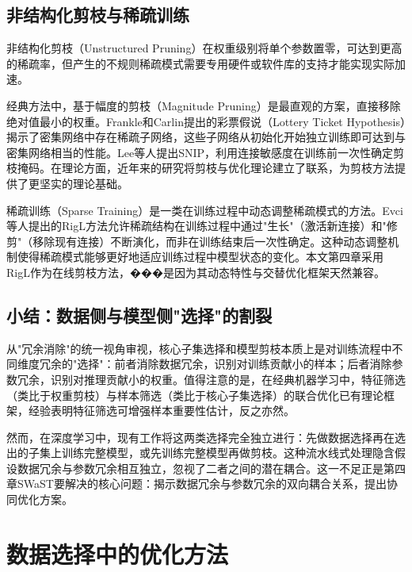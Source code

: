 \subsection{非结构化剪枝与稀疏训练}

非结构化剪枝（Unstructured Pruning）在权重级别将单个参数置零\cite{han2015learning, han2016deep}，可达到更高的稀疏率，但产生的不规则稀疏模式需要专用硬件或软件库的支持才能实现实际加速。

经典方法中，基于幅度的剪枝（Magnitude Pruning）\cite{han2015learning}是最直观的方案，直接移除绝对值最小的权重。Frankle和Carlin\cite{frankle2018lottery}提出的彩票假说（Lottery Ticket Hypothesis）揭示了密集网络中存在稀疏子网络，这些子网络从初始化开始独立训练即可达到与密集网络相当的性能。Lee等人\cite{lee2018snip}提出SNIP，利用连接敏感度在训练前一次性确定剪枝掩码。在理论方面，近年来的研究将剪枝与优化理论建立了联系\cite{grosse2016kronecker, zhou2021effective, louizos2017learning, qian2021probabilistic}，为剪枝方法提供了更坚实的理论基础。

稀疏训练（Sparse Training）是一类在训练过程中动态调整稀疏模式的方法。Evci等人\cite{evci2020rigging}提出的RigL方法允许稀疏结构在训练过程中通过"生长"（激活新连接）和"修剪"（移除现有连接）不断演化，而非在训练结束后一次性确定。这种动态调整机制使得稀疏模式能够更好地适应训练过程中模型状态的变化。本文第四章采用RigL作为在线剪枝方法，���是因为其动态特性与交替优化框架天然兼容。

\subsection{小结：数据侧与模型侧"选择"的割裂}

从"冗余消除"的统一视角审视，核心子集选择和模型剪枝本质上是对训练流程中不同维度冗余的"选择"：前者消除数据冗余，识别对训练贡献小的样本；后者消除参数冗余，识别对推理贡献小的权重。值得注意的是，在经典机器学习中，特征筛选（类比于权重剪枝）与样本筛选（类比于核心子集选择）的联合优化已有理论框架\cite{shibagaki2016simultaneous, zhang2017scaling}，经验表明特征筛选可增强样本重要性估计，反之亦然。

然而，在深度学习中，现有工作将这两类选择完全独立进行：先做数据选择再在选出的子集上训练完整模型，或先训练完整模型再做剪枝。这种流水线式处理隐含假设数据冗余与参数冗余相互独立，忽视了二者之间的潜在耦合。这一不足正是第四章SWaST要解决的核心问题：揭示数据冗余与参数冗余的双向耦合关系，提出协同优化方案。


\section{数据选择中的优化方法}\label{sec:optimization-methods}

